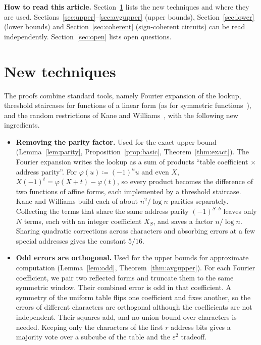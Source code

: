 \documentclass[11pt,letterpaper]{article}
\theoremstyle{remark}
\newcommand{\sect}[1]{\section{\texorpdfstring{\color{ink}#1}{#1}}}
\newcommand{\smalltitle}[1]{\textbf{\color{ink}#1}\quad}
\begin{document}
\smalltitle{How to read this article.}
Section~\ref{sec:tech} lists the new techniques and where they are
used. Sections~\ref{sec:upper}--\ref{sec:avgupper} (upper bounds),
Section~\ref{sec:lower} (lower bounds) and Section~\ref{sec:coherent}
(sign-coherent circuits) can be read independently. Section~\ref{sec:open} lists open questions.

\sect{New techniques}\label{sec:tech}

The proofs combine standard tools, namely Fourier expansion of the lookup,
threshold staircases for functions of a linear form (as for symmetric
functions~\cite[Prop.~2.1]{HMPST}),
and the random restrictions of Kane and Williams~\cite{KW}, with the following
new ingredients.

\begin{itemize}
\item \textbf{Removing the parity factor.} Used for the exact upper
      bound (Lemma~\ref{lem:parity}, Proposition~\ref{prop:basic},
      Theorem~\ref{thm:exact}). The Fourier
      expansion writes the lookup as a sum of products ``table coefficient
      $\times$ address parity''. For $\varphi(u)\coloneqq(-1)^uu$ and even $X$,
      $X(-1)^t=\varphi(X+t)-\varphi(t)$, so every
      product becomes the difference of two functions of affine forms,
      each implemented by a threshold staircase. Kane and Williams build each
      of about $n^2/\log n$ parities
      separately. Collecting the terms that share the same address parity
      $(-1)^{S\cdot b}$ leaves only $N$ terms, each with an integer
      coefficient $X_S$, and saves a factor $n/\log n$. Sharing quadratic corrections across characters and
      absorbing errors at a few special addresses gives the constant $5/16$.
\item \textbf{Odd errors are orthogonal.} Used for the upper bounds for
      approximate computation (Lemma~\ref{lem:odd},
      Theorem~\ref{thm:avgupper}). For each Fourier coefficient, we pair two
      reflected forms and truncate them to the same symmetric window.
      Their combined error is odd in that coefficient. A symmetry of the uniform table flips one coefficient and
      fixes another, so the errors of different characters are orthogonal
      although the coefficients are not independent. Their squares add, and
      no union bound over characters is needed. Keeping only the characters of
      the first $r$ address bits gives a majority vote over a subcube of the
      table and the $\varepsilon^2$ tradeoff.

\end{itemize}
\end{document}

